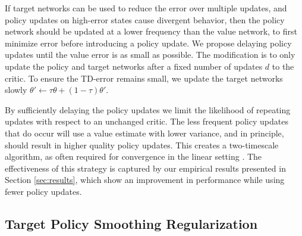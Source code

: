 \documentclass{article}
\begin{document}
If target networks can be used to reduce the error over multiple updates, and policy updates on high-error states cause divergent behavior, then the policy network should be updated at a lower frequency than the value network, to first minimize error before introducing a policy update.
We propose delaying policy updates until the value error is as small as possible. 
The modification is to only update the policy and target networks after a fixed number of updates $d$ to the critic. To ensure the TD-error remains small, we update the target networks slowly $\theta' \leftarrow \tau \theta + (1 - \tau) \theta'$. 

By sufficiently delaying the policy updates we limit the likelihood of repeating updates with respect to an unchanged critic. The less frequent policy updates that do occur will use a value estimate with lower variance, and in principle, should result in higher quality policy updates. This creates a two-timescale algorithm, as often required for convergence in the linear setting \cite{konda2003onactor}. The effectiveness of this strategy is captured by our empirical results presented in Section \ref{sec:results}, which show an improvement in performance while using fewer policy updates. 

\subsection{Target Policy Smoothing Regularization} \label{sec:TPN}
\end{document}
